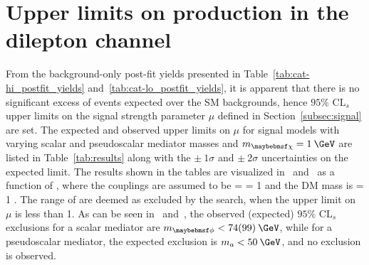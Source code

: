 \section{Upper limits on \ttDM production in the dilepton channel}
\label{sec:UL}

From the background-only post-fit yields presented in Table~\ref{tab:cat-hi_postfit_yields} and~\ref{tab:cat-lo_postfit_yields}, it is apparent that there is no significant excess of events expected over the SM backgrounds, hence $95\%$ $\textrm{CL}_{s}$ upper limits on the signal strength parameter $\mu$ defined in Section~\ref{subsec:signal} are set. The expected and observed upper limits on $\mu$ for signal models with varying scalar and pseudoscalar mediator masses and $\mDM=1\:\GeV$ are listed in Table~\ref{tab:results} along with the $\pm\:1\sigma$ and $\pm\:2\sigma$ uncertainties on the expected limit. The results shown in the tables are visualized in~ and~ as a function of \mMed, where the couplings are assumed to be \gq = \gDM = 1 and the DM mass is \mDM = 1 \GeV. The range of \mMed are deemed as excluded by the search, when the upper limit on $\mu$ is less than 1. As can be seen in~ and~, the observed (expected) $95\%$ $\textrm{CL}_{s}$ exclusions for a scalar mediator are $\mMed<74(99)\:\GeV$, while for a pseudoscalar mediator, the expected exclusion is $m_{a}<50\:\GeV$, and no exclusion is observed. 

